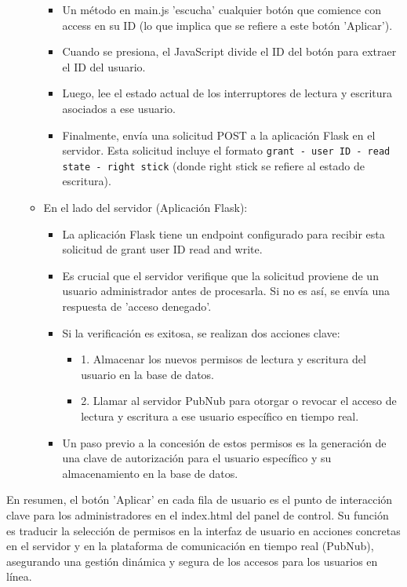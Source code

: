 \documentclass{report}
\begin{document}
\begin{itemize}
\begin{itemize}
\begin{itemize}
                    \item Un método en main.js 'escucha' cualquier botón que comience con access en su ID (lo que implica que se refiere 
                    a este botón 'Aplicar').
                    \item Cuando se presiona, el JavaScript divide el ID del botón para extraer el ID del usuario.
                    \item Luego, lee el estado actual de los interruptores de lectura y escritura asociados a ese usuario.
                    \item Finalmente, envía una solicitud POST a la aplicación Flask en el servidor. Esta solicitud incluye el formato 
                    \verb|grant - user ID - read state - right stick| (donde right stick se refiere al estado de escritura).                
                \end{itemize}
            \item En el lado del servidor (Aplicación Flask):
                \begin{itemize}
                    \item La aplicación Flask tiene un endpoint configurado para recibir esta solicitud de grant user ID read and write.
                    \item Es crucial que el servidor verifique que la solicitud proviene de un usuario administrador antes de procesarla. 
                    Si no es así, se envía una respuesta de 'acceso denegado'.
                    \item Si la verificación es exitosa, se realizan dos acciones clave:
                        \begin{itemize}
                            \item 1. Almacenar los nuevos permisos de lectura y escritura del usuario en la base de datos.
                            \item 2. Llamar al servidor PubNub para otorgar o revocar el acceso de lectura y escritura a ese usuario 
                            específico en tiempo real.
                        \end{itemize}
                    \item Un paso previo a la concesión de estos permisos es la generación de una clave de autorización para el usuario 
                    específico y su almacenamiento en la base de datos.                        
                \end{itemize}
        \end{itemize}
\end{itemize}
En resumen, el botón 'Aplicar' en cada fila de usuario es el punto de interacción clave para los administradores en el index.html del panel 
de control. Su función es traducir la selección de permisos en la interfaz de usuario en acciones concretas en el servidor y en la plataforma 
de comunicación en tiempo real (PubNub), asegurando una gestión dinámica y segura de los accesos para los usuarios en línea.
\end{document}
